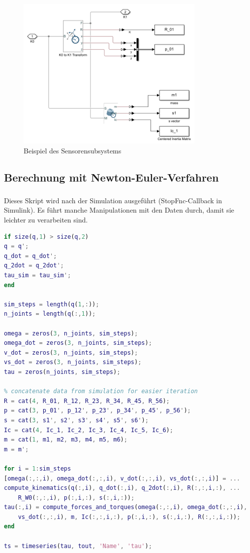 \begin{figure}[!htbp]
	\centering
	\includegraphics[width=0.54\linewidth]{grafic/sensor_koordinatensystem}
	\caption{Beispiel des Sensorensubsystems}
	\label{fig:sensoren_subsystem}
\end{figure}


\subsection{Berechnung mit Newton-Euler-Verfahren}


\subsubsection{}

Dieses Skript wird nach der Simulation ausgeführt (StopFnc-Callback in Simulink).
Es führt manche Manipulationen mit den Daten durch, damit sie leichter zu verarbeiten sind.

\begin{lstlisting}[frame=single, basicstyle=\footnotesize, language=Matlab]
if size(q,1) > size(q,2)
q = q';
q_dot = q_dot';
q_2dot = q_2dot';
tau_sim = tau_sim';
end

sim_steps = length(q(1,:));
n_joints = length(q(:,1));

omega = zeros(3, n_joints, sim_steps);
omega_dot = zeros(3, n_joints, sim_steps);
v_dot = zeros(3, n_joints, sim_steps);
vs_dot = zeros(3, n_joints, sim_steps);
tau = zeros(n_joints, sim_steps);

% concatenate data from simulation for easier iteration
R = cat(4, R_01, R_12, R_23, R_34, R_45, R_56);
p = cat(3, p_01', p_12', p_23', p_34', p_45', p_56');
s = cat(3, s1', s2', s3', s4', s5', s6');
Ic = cat(4, Ic_1, Ic_2, Ic_3, Ic_4, Ic_5, Ic_6);
m = cat(1, m1, m2, m3, m4, m5, m6);
m = m';

for i = 1:sim_steps
[omega(:,:,i), omega_dot(:,:,i), v_dot(:,:,i), vs_dot(:,:,i)] = ...
compute_kinematics(q(:,i), q_dot(:,i), q_2dot(:,i), R(:,:,i,:), ...
	R_W0(:,:,i), p(:,i,:), s(:,i,:));
tau(:,i) = compute_forces_and_torques(omega(:,:,i), omega_dot(:,:,i), ...
	vs_dot(:,:,i), m, Ic(:,:,i,:), p(:,i,:), s(:,i,:), R(:,:,i,:));
end

ts = timeseries(tau, tout, 'Name', 'tau');
\end{lstlisting}


